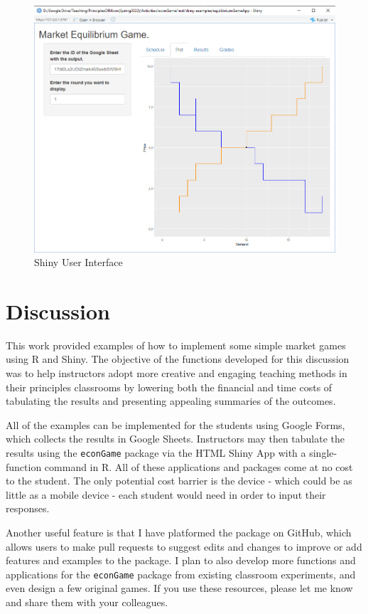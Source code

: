 \documentclass[
]{article}
\begin{document}
\begin{figure}
\centering
\includegraphics{images/Figure3.png}
\caption{Shiny User Interface}
\end{figure}

\hypertarget{discussion}{%
\section{Discussion}\label{discussion}}

This work provided examples of how to implement some simple market games
using R and Shiny. The objective of the functions developed for this
discussion was to help instructors adopt more creative and engaging
teaching methods in their principles classrooms by lowering both the
financial and time costs of tabulating the results and presenting
appealing summaries of the outcomes.

All of the examples can be implemented for the students using Google
Forms, which collects the results in Google Sheets. Instructors may then
tabulate the results using the \texttt{econGame} package via the HTML
Shiny App with a single-function command in R. All of these applications
and packages come at no cost to the student. The only potential cost
barrier is the device - which could be as little as a mobile device -
each student would need in order to input their responses.

Another useful feature is that I have platformed the package on GitHub,
which allows users to make pull requests to suggest edits and changes to
improve or add features and examples to the package. I plan to also
develop more functions and applications for the \texttt{econGame}
package from existing classroom experiments, and even design a few
original games. If you use these resources, please let me know and share
them with your colleagues.
\end{document}
